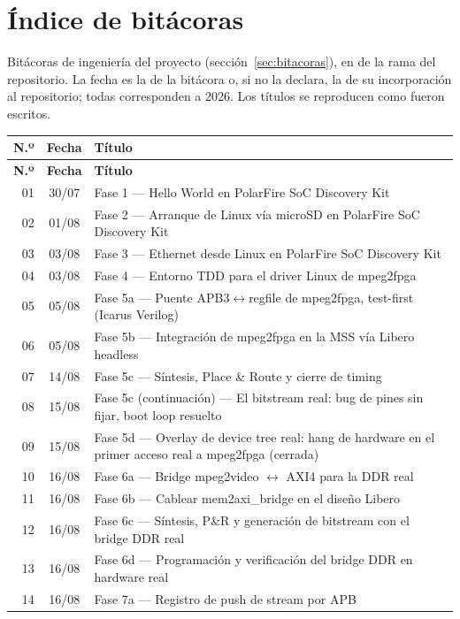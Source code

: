 \chapter{Índice de bitácoras}
\label{anx:bitacoras}

Bitácoras de ingeniería del proyecto (sección~\ref{sec:bitacoras}), en
 de la rama  del repositorio. La fecha es la de
la bitácora o, si no la declara, la de su incorporación al repositorio; todas
corresponden a 2026. Los títulos se reproducen como fueron escritos.

\small
\begin{longtable}{@{}r c p{118mm}@{}}
  \toprule
  \textbf{N.º} & \textbf{Fecha} & \textbf{Título} \\
  \midrule
  \endfirsthead
  \toprule
  \textbf{N.º} & \textbf{Fecha} & \textbf{Título} \\
  \midrule
  \endhead
  01 & 30/07 & Fase 1 — Hello World en PolarFire SoC Discovery Kit \\
  02 & 01/08 & Fase 2 — Arranque de Linux vía microSD en PolarFire SoC Discovery Kit \\
  03 & 03/08 & Fase 3 — Ethernet desde Linux en PolarFire SoC Discovery Kit \\
  04 & 03/08 & Fase 4 — Entorno TDD para el driver Linux de mpeg2fpga \\
  05 & 05/08 & Fase 5a — Puente APB3$\leftrightarrow$regfile de mpeg2fpga, test-first (Icarus Verilog) \\
  06 & 05/08 & Fase 5b — Integración de mpeg2fpga en la MSS vía Libero headless \\
  07 & 14/08 & Fase 5c — Síntesis, Place \& Route y cierre de timing \\
  08 & 15/08 & Fase 5c (continuación) — El bitstream real: bug de pines sin fijar, boot loop resuelto \\
  09 & 15/08 & Fase 5d — Overlay de device tree real: hang de hardware en el primer acceso real a mpeg2fpga (cerrada) \\
  10 & 16/08 & Fase 6a — Bridge mpeg2video $\leftrightarrow$ AXI4 para la DDR real \\
  11 & 16/08 & Fase 6b — Cablear mem2axi\_bridge en el diseño Libero \\
  12 & 16/08 & Fase 6c — Síntesis, P\&R y generación de bitstream con el bridge DDR real \\
  13 & 16/08 & Fase 6d — Programación y verificación del bridge DDR en hardware real \\
  14 & 16/08 & Fase 7a — Registro de push de stream por APB \\

\end{longtable}
